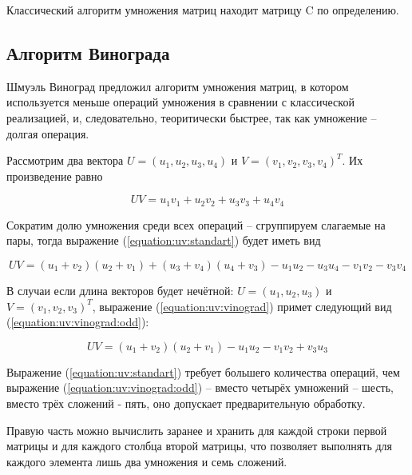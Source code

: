         Классический алгоритм умножения матриц находит матрицу C по определению.

        \subsection{Алгоритм Винограда}
        Шмуэль Виноград предложил алгоритм умножения матриц, в котором используется меньше операций умножения
        в сравнении с классической реализацией, и, следовательно, теоритически быстрее, так как умножение -- долгая операция.

        Рассмотрим два вектора $ U = (u_1, u_2, u_3, u_4) $ и $ V = (v_1, v_2, v_3, v_4)^T $. Их произведение равно 

        \begin{equation}
            UV = u_1v_1 + u_2v_2 + u_3v_3 + u_4v_4
            \label{equation:uv:standart}
        \end{equation}

        Сократим долю умножения среди всех операций -- сгруппируем слагаемые на пары, тогда выражение (\ref{equation:uv:standart}) будет иметь вид

        \begin{equation}
            UV = (u_1 + v_2)(u_2 + v_1) + (u_3 + v_4)(u_4 + v_3) - u_1u_2 - u_3u_4 - v_1v_2 - v_3v_4
            \label{equation:uv:vinograd}
        \end{equation}

        В случаи если длина векторов будет нечётной:
        $ U = (u_1, u_2, u_3) $ и $ V = (v_1, v_2, v_3)^T $,
        выражение (\ref{equation:uv:vinograd}) примет следующий вид (\ref{equation:uv:vinograd:odd}):

        \begin{equation}
            UV = (u_1 + v_2)(u_2 + v_1) - u_1u_2 - v_1v_2 + v_3u_3
            \label{equation:uv:vinograd:odd}
        \end{equation}

        Выражение (\ref{equation:uv:standart}) требует большего количества операций, чем  выражение (\ref{equation:uv:vinograd:odd}) -- вместо четырёх
        умножений -- шесть, вместо трёх сложений - пять, оно  допускает предварительную обработку.

        Правую часть можно вычислить заранее и хранить для каждой строки первой матрицы 
        и для каждого столбца второй матрицы, что позволяет выполнять для каждого элемента
        лишь два умножения и семь сложений. 
        
